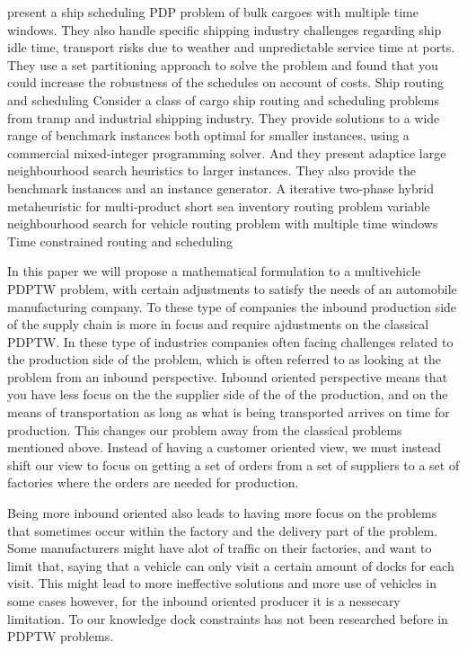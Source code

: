 \documentclass[a4paper,10pt]{article}
\begin{document}
\cite{christiansen02} present a ship scheduling PDP problem of bulk cargoes with multiple time windows. 
They also handle specific shipping industry challenges regarding ship idle time, transport risks due to weather and unpredictable service time at ports. 
They use a set partitioning approach to solve the problem and found that you could increase the robustness of the schedules on account of costs.
\cite{christiansen04} Ship routing and scheduling 
\cite{hemmati14} Consider a class of cargo ship routing and scheduling problems from tramp and industrial shipping industry. 
They provide solutions to a wide range of benchmark instances both optimal for smaller instances, using a commercial mixed-integer programming solver.
And they present adaptice large neighbourhood search heuristics to larger instances.
They also provide the benchmark instances and an instance generator.
\cite{hemmati16} A iterative two-phase hybrid metaheuristic for multi-product short sea inventory routing problem
\cite{ferreira18} variable neighbourhood search for vehicle routing problem with multiple time windows
\cite{desrosiers95} Time constrained routing and scheduling


In this paper we will propose a mathematical formulation to a multivehicle PDPTW problem, with certain adjustments to satisfy the needs of an automobile manufacturing company.
To these type of companies the inbound production side of the supply chain is more in focus and require ajdustments on the classical PDPTW.
In these type of industries companies often facing challenges related to the production side of the problem, which is often referred to as looking at the problem from an inbound perspective.
Inbound oriented perspective means that you have less focus on the the supplier side of the of the production, and on the means of transportation as long as what is being transported arrives on time for production.
This changes our problem away from the classical problems mentioned above. 
Instead of having a customer oriented view, we must instead shift our view to focus on getting a set of orders from a set of suppliers to a set of factories where the orders are needed for production. 
\par
Being more inbound oriented also leads to having more focus on the problems that sometimes occur within the factory and the delivery part of the problem.
Some manufacturers might have alot of traffic on their factories, and want to limit that, saying that a vehicle can only visit a certain amount of docks for each visit.
This might lead to more ineffective solutions and more use of vehicles in some cases however, for the inbound oriented producer it is a nessecary limitation. To our knowledge dock constraints has not been researched before in PDPTW problems. \par
\end{document}
